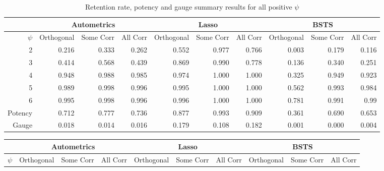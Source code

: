 
\begin{landscape}

\begin{table}[htbp]
  \centering

    \begin{tabular}{r|rrr|rrr|rrr}
  & \multicolumn{3}{c|}{\textbf{Autometrics}}  & \multicolumn{3}{c|}{\textbf{Lasso}}                                                   & \multicolumn{3}{c}{\textbf{BSTS}}                        \\ \hline
$\psi$ & Orthogonal & Some Corr & All Corr & Orthogonal & Some Corr & All Corr & Orthogonal & Some Corr                & All Corr \\ \hline
    2     & 0.216 & 0.333 & 0.262 & 0.552 & 0.977 & 0.766 & 0.003 & 0.179 & 0.116 \\
    3     & 0.414 & 0.568 & 0.439 & 0.869 & 0.990  & 0.778 & 0.136 & 0.340  & 0.251 \\
    4     & 0.948 & 0.988 & 0.985 & 0.974 & 1.000     & 1.000     & 0.325 & 0.949 & 0.923 \\
    5     & 0.989 & 0.998 & 0.996 & 0.995 & 1.000     & 1.000     & 0.562 & 0.993 & 0.984 \\
    6     & 0.995 & 0.998 & 0.996 & 0.996 & 1.000     & 1.000     & 0.781 & 0.991 & 0.99 \\
   \hline
    Potency & 0.712 & 0.777 & 0.736 & 0.877 & 0.993 & 0.909 & 0.361 & 0.690 & 0.653 \\
    Gauge & 0.018 & 0.014 & 0.016 & 0.179 & 0.108 & 0.182 & 0.001 & 0.000 & 0.004 \\


 
    \end{tabular}%
 
    \caption{Retention rate, potency and gauge summary results for all positive $\psi$}
     \label{tab:SummaryPositive}%
\end{table}%

\begin{table}[htbp]
  \centering

    \begin{tabular}{r|rrr|rrr|rrr}
  & \multicolumn{3}{c|}{\textbf{Autometrics}}  & \multicolumn{3}{c|}{\textbf{Lasso}}                                                   & \multicolumn{3}{c}{\textbf{BSTS}}                        \\ \hline
$\psi$ & Orthogonal & Some Corr & All Corr & Orthogonal & Some Corr & All Corr & Orthogonal & Some Corr                & All Corr \\ \hline


\end{tabular}
\end{table}
\end{landscape}
